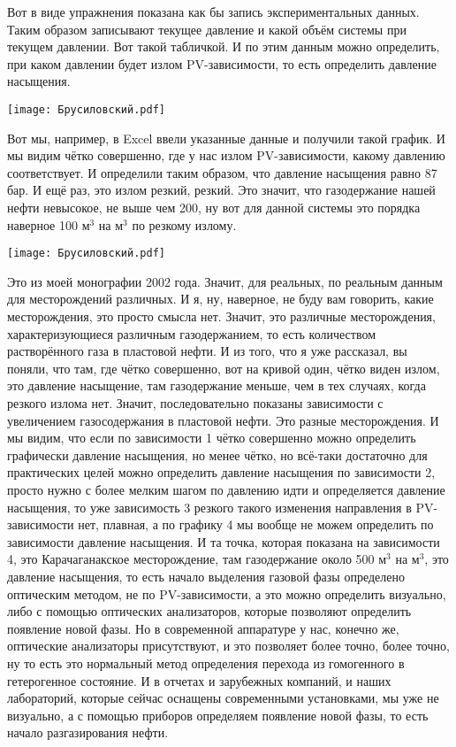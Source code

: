 \documentclass[main.tex]{subfiles}
\begin{document}
Вот в виде упражнения показана как бы запись экспериментальных данных.
Таким образом записывают текущее давление и какой объём системы при текущем давлении.
Вот такой табличкой.
И по этим данным можно определить, при каком давлении будет излом PV-зависимости, то есть определить давление насыщения.

\begin{center}
\texttt{[image: Брусиловский.pdf]}
\end{center}

Вот мы, например, в Excel ввели указанные данные и получили такой график.
И мы видим чётко совершенно, где у нас излом PV-зависимости, какому давлению соответствует.
И определили таким образом, что давление насыщения равно 87 бар.
И ещё раз, это излом резкий, резкий.
Это значит, что газодержание нашей нефти невысокое, не выше чем 200, ну вот для данной системы это порядка наверное 100 м$^3$ на м$^3$ по резкому излому.

\begin{center}
\texttt{[image: Брусиловский.pdf]}
\end{center}

Это из моей монографии 2002 года.
Значит, для реальных, по реальным данным для месторождений различных.
И я, ну, наверное, не буду вам говорить, какие месторождения, это просто смысла нет.
Значит, это различные месторождения, характеризующиеся различным газодержанием, то есть количеством растворённого газа в пластовой нефти.
И из того, что я уже рассказал, вы поняли, что там, где чётко совершенно, вот на кривой один, чётко виден излом, это давление насыщение, там газодержание меньше, чем в тех случаях, когда резкого излома нет.
Значит, последовательно показаны зависимости с увеличением газосодержания в пластовой нефти.
Это разные месторождения.
И мы видим, что если по зависимости 1 чётко совершенно можно определить графически давление насыщения, но менее чётко, но всё-таки достаточно для практических целей можно определить давление насыщения по зависимости 2, просто нужно с более мелким шагом по давлению идти и определяется давление насыщения, то уже зависимость 3 резкого такого изменения направления в PV-зависимости нет, плавная, а по графику 4 мы вообще не можем определить по зависимости давление насыщения.
И та точка, которая показана на зависимости 4, это Карачаганакское месторождение, там газодержание около 500 м$^3$ на м$^3$, это давление насыщения, то есть начало выделения газовой фазы определено оптическим методом, не по PV-зависимости, а это можно определить визуально, либо с помощью оптических анализаторов, которые позволяют определить появление новой фазы.
Но в современной аппаратуре у нас, конечно же, оптические анализаторы присутствуют, и это позволяет более точно, более точно, ну то есть это нормальный метод определения перехода из гомогенного в гетерогенное состояние.
И в отчетах и зарубежных компаний, и наших лабораторий, которые сейчас оснащены современными установками, мы уже не визуально, а с помощью приборов определяем появление новой фазы, то есть начало разгазирования нефти.
\end{document}
